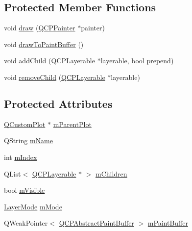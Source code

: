 \subsection*{Protected Member Functions}
\begin{DoxyCompactItemize}
\item 
void \hyperlink{class_q_c_p_layer_ab831a99c8d30b15ec4533ca341e8813b}{draw} (\hyperlink{class_q_c_p_painter}{Q\+C\+P\+Painter} $\ast$painter)
\item 
void \hyperlink{class_q_c_p_layer_a4a8e0a86f31462299e7fc8e8158dd2c6}{draw\+To\+Paint\+Buffer} ()
\item 
void \hyperlink{class_q_c_p_layer_a57ce5e49364aa9122276d5df3b4a0ddc}{add\+Child} (\hyperlink{class_q_c_p_layerable}{Q\+C\+P\+Layerable} $\ast$layerable, bool prepend)
\item 
void \hyperlink{class_q_c_p_layer_ac2f64ac7761650582d968d86670ef362}{remove\+Child} (\hyperlink{class_q_c_p_layerable}{Q\+C\+P\+Layerable} $\ast$layerable)
\end{DoxyCompactItemize}
\subsection*{Protected Attributes}
\begin{DoxyCompactItemize}
\item 
\hyperlink{class_q_custom_plot}{Q\+Custom\+Plot} $\ast$ \hyperlink{class_q_c_p_layer_a2f3374a7884bf403720cd1cf6f7ad1bb}{m\+Parent\+Plot}
\item 
Q\+String \hyperlink{class_q_c_p_layer_a91e6298183cb4b9dfd4efdfaf1ecc220}{m\+Name}
\item 
int \hyperlink{class_q_c_p_layer_a122088bcab6cec76a52b75ce8606605b}{m\+Index}
\item 
Q\+List$<$ \hyperlink{class_q_c_p_layerable}{Q\+C\+P\+Layerable} $\ast$ $>$ \hyperlink{class_q_c_p_layer_a704aa71bba469383c3a3c598c1ec0d28}{m\+Children}
\item 
bool \hyperlink{class_q_c_p_layer_a264950deb08e589460c126c895a1e2b5}{m\+Visible}
\item 
\hyperlink{class_q_c_p_layer_a67dcfc1590be2a1f2227c5a39bb59c7c}{Layer\+Mode} \hyperlink{class_q_c_p_layer_a11bd0aa190d8fa21c8c7673d070737c8}{m\+Mode}
\item 
Q\+Weak\+Pointer$<$ \hyperlink{class_q_c_p_abstract_paint_buffer}{Q\+C\+P\+Abstract\+Paint\+Buffer} $>$ \hyperlink{class_q_c_p_layer_aa0bdbc75e4350a0669ff515b3476a3d3}{m\+Paint\+Buffer}
\end{DoxyCompactItemize}
